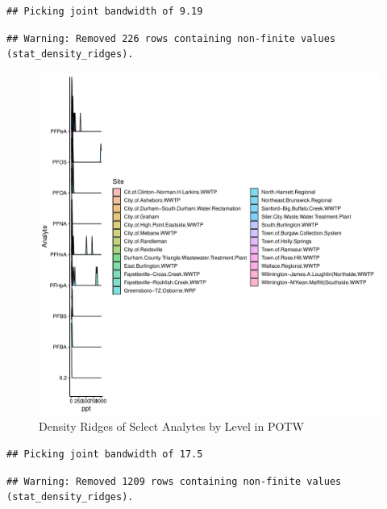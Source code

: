 \documentclass[
  12pt,
]{article}
\begin{document}
\begin{verbatim}
## Picking joint bandwidth of 9.19
\end{verbatim}

\begin{verbatim}
## Warning: Removed 226 rows containing non-finite values (stat_density_ridges).
\end{verbatim}

\begin{figure}

\includegraphics{PFAS_FinalProject_files/figure-latex/unnamed-chunk-6-1} \hfill{}

\caption{Density Ridges of Select Analytes by Level in POTW}\label{fig:unnamed-chunk-6}
\end{figure}

\begin{verbatim}
## Picking joint bandwidth of 17.5
\end{verbatim}

\begin{verbatim}
## Warning: Removed 1209 rows containing non-finite values (stat_density_ridges).
\end{verbatim}
\end{document}
